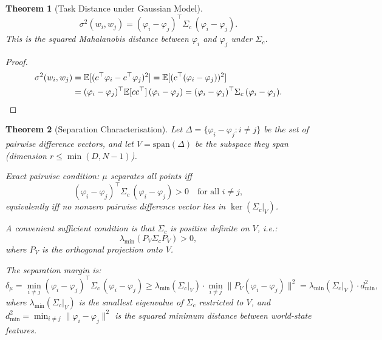 \documentclass[12pt]{article}
\newtheorem{theorem}{Theorem}[section]
\newcommand{\dmu}{\delta_\mu}
\newcommand{\sigmasq}{\sigma^2}
\newcommand{\E}{\mathbb{E}}
\begin{document}
\begin{theorem}[Task Distance under Gaussian Model]\label{thm:gaussian-distance}
\begin{equation}\label{eq:mahalanobis}
\sigmasq(w_i, w_j) = (\varphi_i - \varphi_j)^\top \Sigma_c\, (\varphi_i - \varphi_j).
\end{equation}
This is the squared Mahalanobis distance between $\varphi_i$ and $\varphi_j$ under $\Sigma_c$.
\end{theorem}

\begin{proof}
\begin{align*}
\sigmasq(w_i, w_j) &= \E[(c^\top \varphi_i - c^\top \varphi_j)^2]
                     = \E[(c^\top(\varphi_i - \varphi_j))^2] \\
                    &= (\varphi_i - \varphi_j)^\top \E[cc^\top]\, (\varphi_i - \varphi_j)
                     = (\varphi_i - \varphi_j)^\top \Sigma_c\, (\varphi_i - \varphi_j). \qedhere
\end{align*}
\end{proof}

\begin{theorem}[Separation Characterisation]\label{thm:gaussian-separation}
Let $\Delta = \{\varphi_i - \varphi_j : i \ne j\}$ be the set of pairwise difference vectors, and let $V = \mathrm{span}(\Delta)$ be the subspace they span (dimension $r \le \min(D, N-1)$).

\emph{Exact pairwise condition:} $\mu$ separates all points iff
\begin{equation}
(\varphi_i - \varphi_j)^\top \Sigma_c\, (\varphi_i - \varphi_j) > 0 \quad \text{for all } i \ne j,
\end{equation}
equivalently iff no nonzero pairwise difference vector lies in $\ker(\Sigma_c|_V)$.

A convenient sufficient condition is that $\Sigma_c$ is positive definite on $V$, i.e.:
\begin{equation}
\lambda_{\min}(P_V \Sigma_c P_V) > 0,
\end{equation}
where $P_V$ is the orthogonal projection onto $V$.

The separation margin is:
\begin{equation}\label{eq:spectral-margin}
\dmu = \min_{i \ne j} (\varphi_i - \varphi_j)^\top \Sigma_c\, (\varphi_i - \varphi_j)
     \ge \lambda_{\min}(\Sigma_c|_V) \cdot \min_{i \ne j} \|P_V(\varphi_i - \varphi_j)\|^2
     = \lambda_{\min}(\Sigma_c|_V) \cdot d^2_{\min},
\end{equation}
where $\lambda_{\min}(\Sigma_c|_V)$ is the smallest eigenvalue of $\Sigma_c$ restricted to $V$, and $d^2_{\min} = \min_{i \ne j} \|\varphi_i - \varphi_j\|^2$ is the squared minimum distance between world-state features.
\end{theorem}
\end{document}
